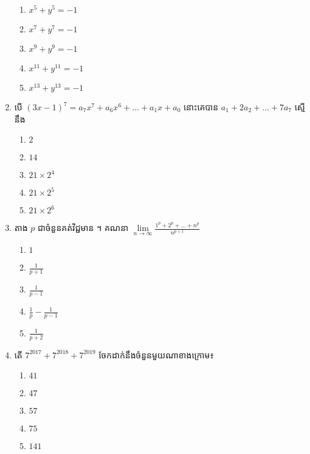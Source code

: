 \documentclass[12pt, a4paper]{article}
\begin{document}
\begin{enumerate}[m]
\begin{enumerate}[k,3]
		\item $x^5+y^5=-1$
		\item $x^7+y^7=-1$
		\item $x^9+y^9=-1$
		\item $x^{11}+y^{11}=-1$
		\item $x^{13}+y^{13}=-1$
	\end{enumerate}
	{\color{blue}\hrulefill}
	\item បើ $\left(3x-1\right)^7=a_7x^7+a_6x^6+\dots+a_1x+a_0$ នោះគេបាន $a_1+2a_2+\dots+7a_7$ ស្មើនឹង
	\begin{enumerate}[k,5]
		\item $2$
		\item $14$
		\item $21\times2^4$
		\item $21\times2^5$
		\item $21\times2^6$
	\end{enumerate}
	{\color{blue}\hrulefill}
	\item តាង $p$ ជាចំនួនគត់វិជ្ជមាន ។ គណនា $\lim\limits_{n\to\infty}\frac{1^{p}+2^{p}+\dots+n^{p}}{n^{p+1}}$
	\begin{enumerate}[k,5]
		\item $1$
		\item $\frac{1}{p+1}$
		\item $\frac{1}{p-1}$
		\item $\frac{1}{p}-\frac{1}{p-1}$
		\item $\frac{1}{p+2}$
	\end{enumerate}
	{\color{blue}\hrulefill}
	\item តើ $7^{2017}+7^{2018}+7^{2019}$ ចែកដាក់នឹងចំនួនមួយណាខាងក្រោម៖
	\begin{enumerate}[k,5]
		\item $41$
		\item $47$
		\item $57$
		\item $75$
		\item $141$ 
	\end{enumerate}
	{\color{blue}\hrulefill}
\end{enumerate}
\newpage
\maketitle\koc
{\color{blue}\hrulefill}
\end{document}

